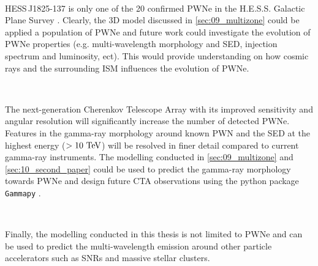 \par~\par
\mbox{HESS\,J1825-137} is only one of the 20 confirmed PWNe in the H.E.S.S. Galactic Plane Survey \citep{2018A&A...612A...1H}. Clearly, the 3D model discussed in \autoref{sec:09_multizone} could be applied a population of PWNe and future work could investigate the evolution of PWNe properties (e.g. multi-wavelength morphology and SED, injection spectrum and luminosity, ect). This would provide understanding on how cosmic rays and the surrounding ISM influences the evolution of PWNe.
\par~\par
The next-generation Cherenkov Telescope Array with its improved sensitivity and angular resolution \citep{2019scta.book.....C} will significantly increase the number of detected PWNe. Features in the gamma-ray morphology around known PWN and the SED at the highest energy ($>10~\TeV$) will be resolved in finer detail compared to current gamma-ray instruments. The modelling conducted in \autoref{sec:09_multizone} and \autoref{sec:10_second_paper} could be used to predict the gamma-ray morphology towards PWNe and design future CTA observations using the python package {\tt Gammapy} \citep{gammapy:2017}.
\par~\par 
Finally, the modelling conducted in this thesis is not limited to PWNe and can be used to predict the multi-wavelength emission around other particle accelerators such as SNRs and massive stellar clusters.